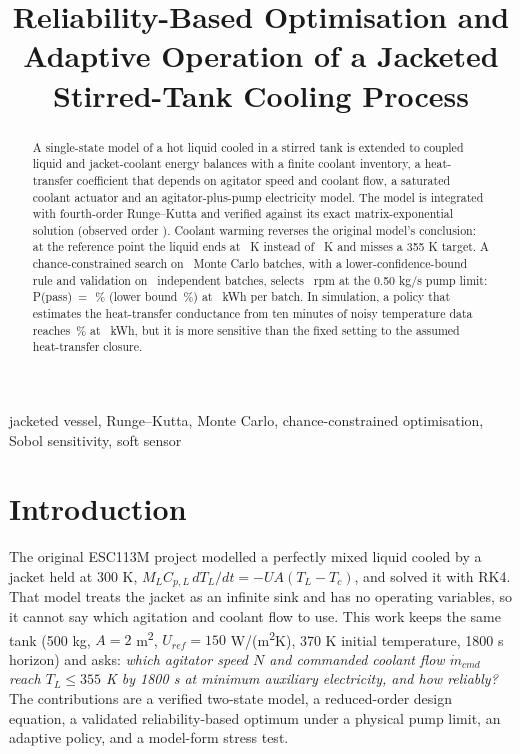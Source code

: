 \documentclass[conference,letterpaper]{IEEEtran}
\newcommand{\mdot}{\dot m}
\begin{document}
\title{Reliability-Based Optimisation and Adaptive Operation of a Jacketed Stirred-Tank Cooling Process}

\author{
}

\maketitle

\begin{abstract}
A single-state model of a hot liquid cooled in a stirred tank is extended to coupled liquid and jacket-coolant energy balances with a finite coolant inventory, a heat-transfer coefficient that depends on agitator speed and coolant flow, a saturated coolant actuator and an agitator-plus-pump electricity model. The model is integrated with fourth-order Runge--Kutta and verified against its exact matrix-exponential solution (observed order \vConvOrder). Coolant warming reverses the original model's conclusion: at the reference point the liquid ends at \vTBase\ K instead of \vTOrig\ K and misses a 355 K target. A chance-constrained search on \vNOpt\ Monte Carlo batches, with a lower-confidence-bound rule and validation on \vNVal\ independent batches, selects \vRecRpm\ rpm at the 0.50 kg/s pump limit: P(pass)~=~\vRecPass\,\% (lower bound \vRecLB\,\%) at \vRecE\ kWh per batch. In simulation, a policy that estimates the heat-transfer conductance from ten minutes of noisy temperature data reaches \vAdPass\,\% at \vAdMeanE\ kWh, but it is more sensitive than the fixed setting to the assumed heat-transfer closure.
\end{abstract}

\begin{IEEEkeywords}
jacketed vessel, Runge--Kutta, Monte Carlo, chance-constrained optimisation, Sobol sensitivity, soft sensor
\end{IEEEkeywords}

\section{Introduction}
The original ESC113M project modelled a perfectly mixed liquid cooled by a jacket held at 300 K, \(M_LC_{p,L}\,dT_L/dt = -UA(T_L - T_c)\), and solved it with RK4. That model treats the jacket as an infinite sink and has no operating variables, so it cannot say which agitation and coolant flow to use. This work keeps the same tank (500 kg, \(A = 2\) m\textsuperscript{2}, \(U_{ref} = 150\) W/(m\textsuperscript{2}K), 370 K initial temperature, 1800 s horizon) and asks: \emph{which agitator speed \(N\) and commanded coolant flow \(\mdot_{cmd}\) reach \(T_L \le 355\) K by 1800 s at minimum auxiliary electricity, and how reliably?} The contributions are a verified two-state model, a reduced-order design equation, a validated reliability-based optimum under a physical pump limit, an adaptive policy, and a model-form stress test.
\end{document}
